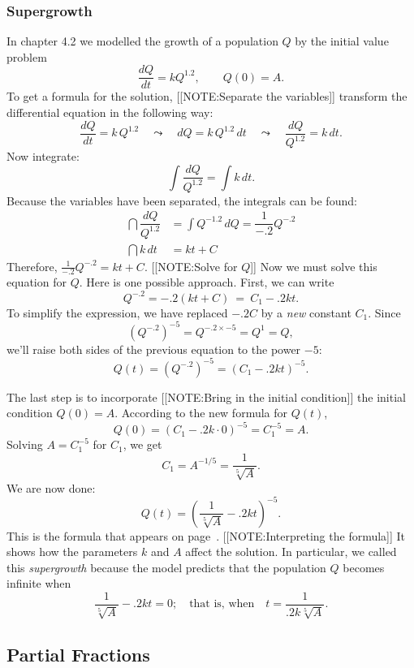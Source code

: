 \subsubsection{Supergrowth}
\label{subsubsec:supergrowth}

In chapter 4.2 we modelled the growth of a population $Q$ by the
initial value problem
	\[
\dfrac{dQ}{dt} = k Q^{1.2}, \qquad Q(0) = A.
\]
To get a formula for the solution, 
[[NOTE:Separate the variables]]
transform the differential equation in the following way:
	\[
\dfrac{dQ}{dt} = k \, Q^{1.2} \quad \leadsto \quad 
		dQ = k \, Q^{1.2} \, dt \quad \leadsto \quad
		\dfrac{dQ}{Q^{1.2}} = k \, dt.
\]
Now integrate:
	\[
\int \dfrac{dQ}{Q^{1.2}} = \int k \, dt.
\]
Because the variables have been separated, the integrals can be found:
\begin{align*}
\dint \dfrac{dQ}{Q^{1.2}} 
   &= \int Q^{-1.2} \, dQ = \dfrac{1}{-.2} Q^{-.2} \\[3pt]
\dint k \, dt &= kt + C
\end{align*}
Therefore, $\tfrac{1}{-.2} Q^{-.2} = kt + C$.  
[[NOTE:Solve for $Q$]]
Now we must solve this equation for $Q$.  Here is one possible
approach.  First, we can write
	\[
Q^{-.2} = -.2(kt + C) \ = \ C_1 -.2kt.
\]
To simplify the expression, we have replaced $-.2C$ by a {\em new\/}
constant $C_1$.  Since
	\[
(Q^{-.2})^{-5} = Q^{-.2 \times -5} = Q^1 = Q,
\] 
we'll raise both sides of the previous equation to the power $-5$:
	\[
Q(t) = (Q^{-.2})^{-5} = (C_1 -.2kt)^{-5}.
\]

The last step is to incorporate 
[[NOTE:Bring in the  initial condition]]
the initial condition $Q(0) = A$.  According to the new formula for
$Q(t)$,
	\[
Q(0) = (C_1 -.2k\cdot 0)^{-5} = C_1^{-5} = A.
\]
Solving $A = C_1^{-5}$ for $C_1$, we get 
	\[
C_1 = A^{-1/5} = \dfrac{1}{\sqrt[5]{A}}.
\]
We are now done:
	\[
Q(t) = \left(\dfrac{1}{\sqrt[5]{A}} -.2kt \right)^{-5}.
\]
This is the formula that appears on page~\pageref{supergrowth soln}.  
[[NOTE:Interpreting  the formula]]
It shows how the parameters $k$ and $A$ affect the solution.  
In particular, we called this {\em supergrowth\/} because the model predicts that the population $Q$ becomes infinite when 
	\[
\dfrac{1}{\sqrt[5]{A}} -.2kt = 0; \quad \mbox{that is, when}
		\quad t = \dfrac{1}{.2k \sqrt[5]{A}}.
\] 	

\subsection{Partial Fractions}
\label{subsec:partial-fractions}

